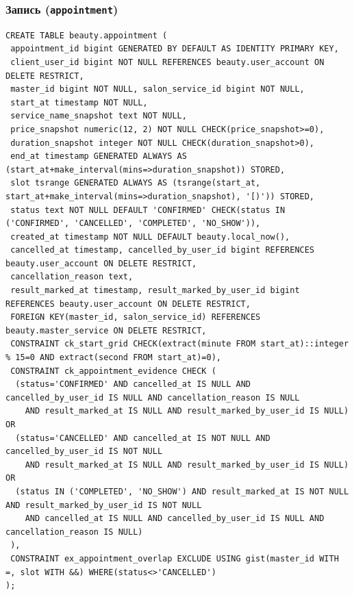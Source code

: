 \documentclass[11pt,a4paper]{article}
\begin{document}
\par\medskip\noindent\begin{minipage}{\linewidth}
\subsubsection*{Запись (\texttt{appointment})}
\begin{lstlisting}[style=sql]
CREATE TABLE beauty.appointment (
 appointment_id bigint GENERATED BY DEFAULT AS IDENTITY PRIMARY KEY,
 client_user_id bigint NOT NULL REFERENCES beauty.user_account ON DELETE RESTRICT,
 master_id bigint NOT NULL, salon_service_id bigint NOT NULL,
 start_at timestamp NOT NULL,
 service_name_snapshot text NOT NULL,
 price_snapshot numeric(12, 2) NOT NULL CHECK(price_snapshot>=0),
 duration_snapshot integer NOT NULL CHECK(duration_snapshot>0),
 end_at timestamp GENERATED ALWAYS AS (start_at+make_interval(mins=>duration_snapshot)) STORED,
 slot tsrange GENERATED ALWAYS AS (tsrange(start_at, start_at+make_interval(mins=>duration_snapshot), '[)')) STORED,
 status text NOT NULL DEFAULT 'CONFIRMED' CHECK(status IN ('CONFIRMED', 'CANCELLED', 'COMPLETED', 'NO_SHOW')),
 created_at timestamp NOT NULL DEFAULT beauty.local_now(),
 cancelled_at timestamp, cancelled_by_user_id bigint REFERENCES beauty.user_account ON DELETE RESTRICT,
 cancellation_reason text,
 result_marked_at timestamp, result_marked_by_user_id bigint REFERENCES beauty.user_account ON DELETE RESTRICT,
 FOREIGN KEY(master_id, salon_service_id) REFERENCES beauty.master_service ON DELETE RESTRICT,
 CONSTRAINT ck_start_grid CHECK(extract(minute FROM start_at)::integer % 15=0 AND extract(second FROM start_at)=0),
 CONSTRAINT ck_appointment_evidence CHECK (
  (status='CONFIRMED' AND cancelled_at IS NULL AND cancelled_by_user_id IS NULL AND cancellation_reason IS NULL
    AND result_marked_at IS NULL AND result_marked_by_user_id IS NULL) OR
  (status='CANCELLED' AND cancelled_at IS NOT NULL AND cancelled_by_user_id IS NOT NULL
    AND result_marked_at IS NULL AND result_marked_by_user_id IS NULL) OR
  (status IN ('COMPLETED', 'NO_SHOW') AND result_marked_at IS NOT NULL AND result_marked_by_user_id IS NOT NULL
    AND cancelled_at IS NULL AND cancelled_by_user_id IS NULL AND cancellation_reason IS NULL)
 ),
 CONSTRAINT ex_appointment_overlap EXCLUDE USING gist(master_id WITH =, slot WITH &&) WHERE(status<>'CANCELLED')
);
\end{lstlisting}
\end{minipage}\par\medskip
\end{document}
